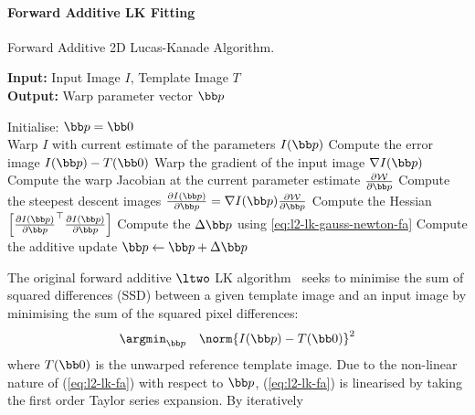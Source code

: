 \paragraph{Forward Additive LK Fitting}\label{subsubsec:lk-fa}
\begin{algorithm}[t]
\caption{Forward Additive 2D Lucas-Kanade Algorithm.}
\label{alg:lk_2d_fa}
    {\textbf{Input:} Input Image $I$, Template Image $T$} \\
    {\textbf{Output:} Warp parameter vector $\p$}  \\
    \begin{algorithmic}[1]
        \State{}Initialise: $\p = \zero$\\
        \While{$\norm{\Delta \p} > \epsilon$} %
            \State{}Warp $I$ with current estimate of the parameters $I(\p)$
            \State{}Compute the error image $I(\p) - T(\zero)$
            \State{}Warp the gradient of the input image $\nabla I(\p)$
            \State{}Compute the warp Jacobian at the current parameter estimate $\frac{\partial \mathcal{W}}{\partial \p}$
            \State{}Compute the steepest descent images $\frac{\partial I(\p)}{\partial \p} = \nabla I(\p) \frac{\partial \mathcal{W}}{\partial \p}$
            \State{}Compute the Hessian $\left[ {\frac{\partial I(\p)}{\partial \p}}^{\top} \frac{\partial I(\p)}{\partial \p} \right]$
            \State{}Compute the $\Delta \p$ using \cref{eq:l2-lk-gauss-newton-fa}
            \State{}Compute the additive update $\p \leftarrow \p + \Delta \p$
        \EndWhile{}
    \end{algorithmic}
\end{algorithm}
The original forward additive $\ltwo$ LK
algorithm~\cite{baker2004lucas,lucas1981iterative} seeks to minimise the sum of
squared differences (SSD) between a given template image and an input image by
minimising the sum of the squared pixel differences:
\begin{equation}\label{eq:l2-lk-fa}
    \argmin_{\p} \quad \norm{I(\p) - T(\zero)}^2
\end{equation}
where $T(\zero)$ is the unwarped reference template image. Due to the non-linear
nature of (\ref{eq:l2-lk-fa}) with respect to $\p$, (\ref{eq:l2-lk-fa}) is
linearised by taking the first order Taylor series expansion. By iteratively
